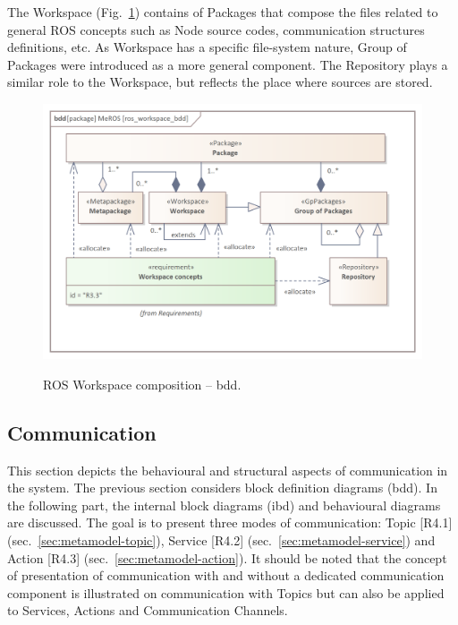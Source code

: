 \documentclass[11pt,oneside,a4paper]{article}
\begin{document}
	The Workspace (Fig.~\ref{fig:ros_workspace_bdd}) contains of Packages that compose the files related to general ROS concepts such as Node source codes, communication structures definitions, etc. As Workspace has a specific file-system nature, Group of Packages were introduced as a more general component. The Repository plays a similar role to the Workspace, but reflects the place where sources are stored.
	

	\begin{figure}[H]
		\centering
		\begin{center}
			{\includegraphics[scale=1.1]{img/meros_pkg/ros_workspace_bdd.png}}
		\end{center}
		\caption{ROS Workspace composition -- bdd.} 
		\label{fig:ros_workspace_bdd}
	\end{figure}
	

		

	
	
	
\subsection{Communication}
\label{sec:metamodel-communication}
	
	This section depicts the behavioural and structural aspects of communication in the system. The previous section considers block definition diagrams (bdd). In the following part, the internal block diagrams (ibd) and behavioural diagrams are discussed. The goal is to present three modes of communication: Topic [R4.1] (sec.~\ref{sec:metamodel-topic}), Service [R4.2] (sec.~\ref{sec:metamodel-service}) and Action [R4.3] (sec.~\ref{sec:metamodel-action}). It should be noted that the concept of presentation of communication with and without a dedicated communication component is illustrated on communication with Topics but can also be applied to Services, Actions and Communication Channels.
	
\end{document}
